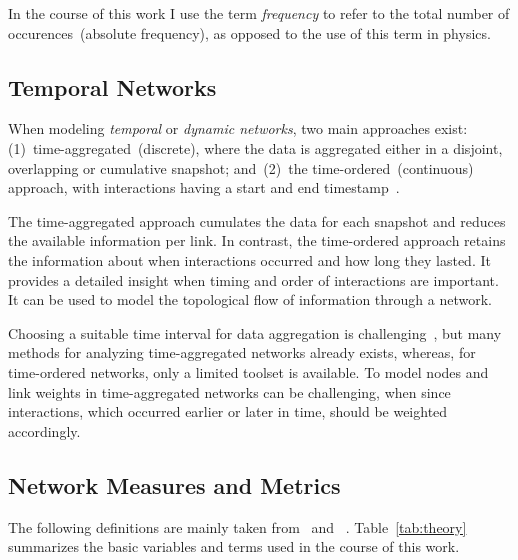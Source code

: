 In the course of this work I use the term \emph{frequency} to refer to the total number of occurences~(absolute frequency), as opposed to the use of this term in physics. 


\subsection{Temporal Networks}
When modeling \emph{temporal} or \emph{dynamic networks}, two main approaches exist: (1)~time-aggregated~(discrete), where the data is aggregated either in a disjoint, overlapping or cumulative snapshot; and~(2)~the time-ordered~(continuous) approach, with interactions having a start and end timestamp~\cite{moody2005dynamic, Pinter-Wollman2014, blonder2012temporal}.

The time-aggregated approach cumulates the data for each snapshot and reduces the available information per link.
In contrast, the time-ordered approach retains the information about when interactions occurred and how long they lasted.
It provides a detailed insight when timing and order of interactions are important.
It can be used to model the topological flow of information through a network.

Choosing a suitable time interval for data aggregation is challenging~\cite{Pinter-Wollman2014}, but many methods for analyzing time-aggregated networks already exists, whereas, for time-ordered networks, only a limited toolset is available.
To model nodes and link weights in time-aggregated networks can be challenging, when since interactions, which occurred earlier or later in time, should be weighted accordingly.

\subsection{Network Measures and Metrics}
\label{sec:definitions}
The following definitions are mainly taken from~\textcite{barabasi2016network} and ~\textcite{newman2010networks}. Table~\ref{tab:theory} summarizes the basic variables and terms used in the course of this work.

